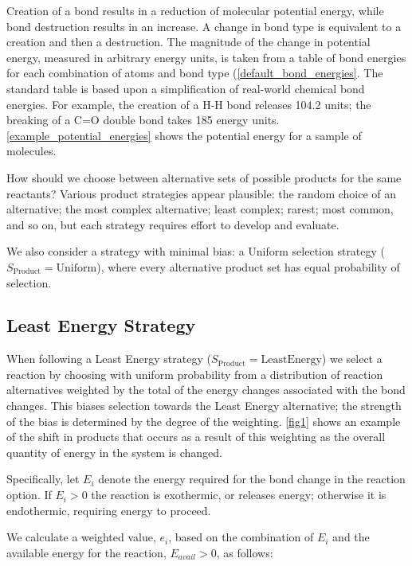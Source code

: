 Creation of a bond results in a reduction of molecular potential energy,
while bond destruction results in an increase. A change in bond type is
equivalent to a creation and then a destruction. The magnitude of the
change in potential energy, measured in arbitrary energy units, is taken
from a table of bond energies for each combination of atoms and bond
type (\cref{default_bond_energies}. The standard table is based upon
a simplification of real-world chemical bond energies. For example, the
creation of a H-H bond releases 104.2 units; the breaking of a C=O
double bond takes 185 energy units. \cref{example_potential_energies}
shows the potential energy for a sample of molecules.

How should we choose between alternative sets of possible products for
the same reactants? Various product strategies appear plausible: the
random choice of an alternative; the most complex alternative; least
complex; rarest; most common, and so on, but each strategy requires
effort to develop and evaluate.

We also consider a strategy with minimal bias: a Uniform selection
strategy ($S_\mathrm{Product} = \mathrm{Uniform}$), where every
alternative product set has equal probability of selection.

\subsection{Least Energy Strategy}\label{least-energy-strategy}

When following a Least Energy strategy
($S_\mathrm{Product} = \mathrm{LeastEnergy}$) we select a reaction by
choosing with uniform probability from a distribution of reaction
alternatives weighted by the total of the energy changes associated with
the bond changes. This biases selection towards the Least Energy
alternative; the strength of the bias is determined by the degree of the
weighting. \cref{fig1} shows an example of the shift in products that occurs as a result of
this weighting as the overall quantity of energy in the system is
changed.

Specifically, let $E_i$ denote the energy required for the bond change in the reaction option. If $E_i > 0$ the reaction is exothermic, or releases energy; otherwise it is endothermic, requiring energy to proceed.

We calculate a weighted value, $e_i$, based on the combination of $E_i$ and the available energy for the reaction, $E_{avail} > 0$, as follows:

